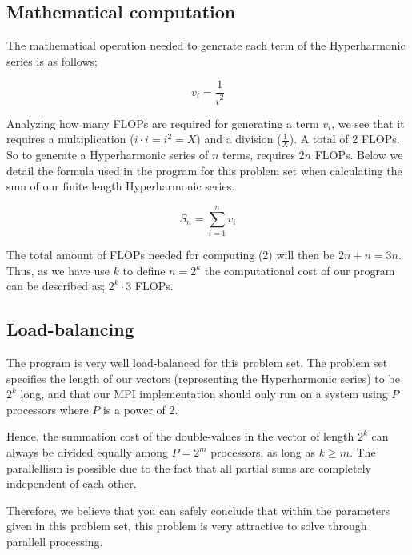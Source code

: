 \documentclass[fontsize=11pt,paper=a4,titlepage]{report}
\begin{document}
\subsection{Mathematical computation}

The mathematical operation needed to generate each term of the Hyperharmonic
series is as follows;

\begin{equation}
	v_i = \frac{1}{i^2}
\end{equation}

Analyzing how many FLOPs are required for generating a term $v_i$, we see that
it requires a multiplication ($i\cdot i = i^2 = X$) and a division ($\frac{1}{X}$).
A total of 2 FLOPs. So to generate a Hyperharmonic series of $n$ terms, requires
$2n$ FLOPs. Below we detail the formula used in the program for this problem set
when calculating the sum of our finite length Hyperharmonic series.

\begin{equation}
	S_n = \sum_{i=1}^{n} v_i
\end{equation}

The total amount of FLOPs needed for computing (2) will then be $2n + n = 3n$. Thus, as we have use $k$ to define $n=2^k$ the computational cost of our program can be described as; $2^k\cdot 3$ FLOPs.

\subsection{Load-balancing}

The program is very well load-balanced for this problem set. The problem set
specifies the length of our vectors (representing the Hyperharmonic series) to
be $2^k$ long, and that our MPI implementation should only run on a system using
$P$ processors where $P$ is a power of 2.

Hence, the summation cost of the double-values in the vector of length $2^k$ can
always be divided equally among $P = 2^m$ processors, as long as $k\geq m$. The parallellism is
possible due to the fact that all partial sums are completely independent of
each other. \newline

Therefore, we believe that you can safely conclude that within the parameters
given in this problem set, this problem is very attractive to solve through
parallell processing.



% 
% 
% 
% 

\listoffigures
\listoftables
\end{document}
